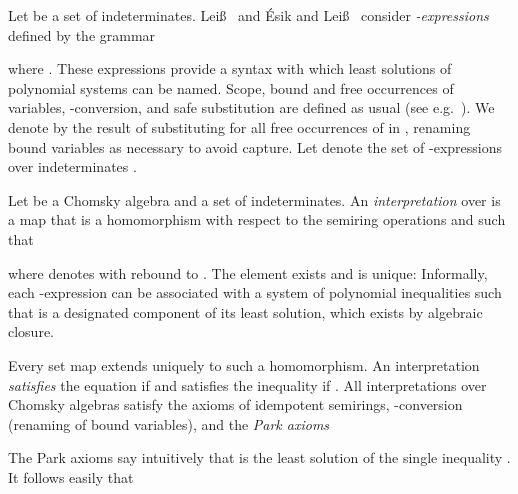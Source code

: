 \documentclass[copyright,creativecommons]{eptcs}
\theoremstyle{remark}
\newcommand{\fhcomment}[1]{\textcolor{red}{[\textbf{Comment (FH)}: {#1}]}}
\newcommand{\dkcomment}[1]{\textcolor{blue}{[\textbf{Comment (DK)}: {#1}]}}
\renewcommand{\fhcomment}[1]{}
\renewcommand{\dkcomment}[1]{}
\begin{document}
Let  be a set of indeterminates.
Lei\ss\ \cite{leiss92b} and \'Esik and Lei\ss\ \cite{esle2002,EsikLeiss05} consider \emph{-expressions} defined by the grammar

where . These expressions provide a syntax with which least solutions of polynomial systems can be named. Scope, bound and free occurrences of variables, -conversion, and safe substitution are defined as usual (see e.g.\ \cite{Barendregt84}). We denote by  the result of substituting  for all free occurrences of  in , renaming bound variables as necessary to avoid capture. Let  denote the set of -expressions over indeterminates . 

Let  be a Chomsky algebra and  a set of indeterminates.
An \emph{interpretation} over  is a map
\fhcomment{Not a semiring homomorphism, since domain  not a semiring.}\dkcomment{OK, how about ``homomorphism with respect to the semiring operators''}\fhcomment{OK.} that is a homomorphism with respect to the semiring operations and 
such that

where  denotes  with  rebound to .
The element  exists and is unique: Informally,
each -expression  can be associated with a system of polynomial inequalities such that  is a designated component of its least
solution, which exists by algebraic closure.
\fhcomment{Change to: by Beki\'c's Theorem.}\dkcomment{No, it's by algebraic closure. Nothing to do with Beki\'c.}\fhcomment{The  here is from , which may contain occurrences of .  The definition of algebraic closure only requires least solutions for polynomials from .  Isn't it a bit brief to say that this, existence of least solutions, also holds for  by algebraic closure (which I'd read as ``follows immediately from the definition of algebraic closure'')?}

Every set map  extends uniquely to such a homomorphism. An interpretation  \emph{satisfies} the equation  if  and satisfies the inequality  if . All interpretations over Chomsky algebras satisfy the axioms of idempotent semirings, -conversion (renaming of bound variables), and the \emph{Park axioms}
\fhcomment{Add: Reference to where they are introduced.}\dkcomment{??}\fhcomment{First or canonical piece of literature that contains the 
Park axioms.  Presumably something Park has written and that subsequently was called Park by somebody else in another paper.  Couldn't find those references, and I'm curious...}
The Park axioms say intuitively that  is the least solution of the single inequality .
\fhcomment{Change to: names the least solution}\dkcomment{Ah, the classic dilemma of use vs. mention. Technically you are right but it's a common abuse in algebra and logic. I personally would prefer to stick with ``is'' but willing to go with ``names'' if it makes you happy. But, realize, if we do this, we technically should change the next statement to `` and  name the same element under any interpretation.''}\fhcomment{OK.  I was suggesting ``names'' only as linguistic connection to the occurrence of ``name'' in ``to name least solutions'' below.}It follows easily that
\end{document}
